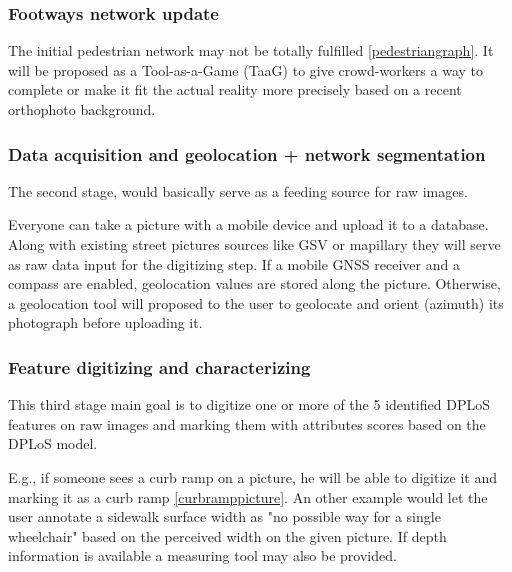\documentclass[10pt,conference,a4paper]{IEEEtran}
\begin{document}
\subsubsection*{Footways network update}
The initial pedestrian network may not be totally fulfilled \ref{pedestriangraph}. It will be proposed as a Tool-as-a-Game (TaaG) to give crowd-workers a way to complete or make it fit the actual reality more precisely based on a recent orthophoto background. %


\subsubsection*{Data acquisition and geolocation + network segmentation}
The second stage, %
would basically serve as a feeding source for raw images. 

Everyone can take a picture with a mobile device and upload it to a database. Along with existing street pictures sources like GSV or mapillary \cite{sweden_street-level_nodate,neuhold2017mapillary} %
they will serve as raw data input for the digitizing step.
If a mobile GNSS receiver and a compass are enabled, geolocation values are stored along the picture. Otherwise, a geolocation tool will proposed to the user to geolocate and orient (azimuth) its photograph before uploading it. %



\subsubsection*{Feature digitizing and characterizing}
This third stage %
main goal is to digitize one or more of the 5 identified DPLoS features on raw images and marking them with attributes scores based on the DPLoS model. 

E.g., if someone sees a curb ramp on a picture, he will be able to digitize it and marking it as a curb ramp \ref{curbramppicture}. An other example would let the user annotate a sidewalk surface width as %
"no possible way for a single wheelchair" based on the perceived width on the given picture. If depth information is available %
a measuring tool may also be provided.
\end{document}
